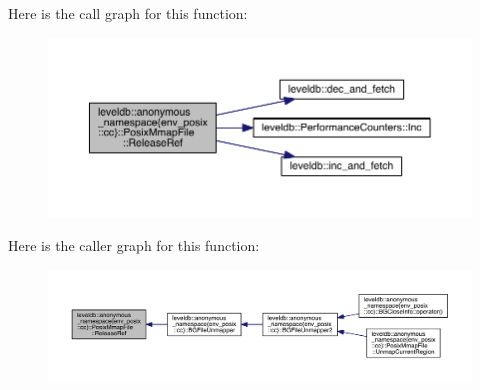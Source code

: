 Here is the call graph for this function\+:
\nopagebreak
\begin{figure}[H]
\begin{center}
\leavevmode
\includegraphics[width=350pt]{classleveldb_1_1anonymous__namespace_02env__posix_8cc_03_1_1_posix_mmap_file_a2a19f6a33c994f7be4df4a185accbeba_cgraph}
\end{center}
\end{figure}




Here is the caller graph for this function\+:
\nopagebreak
\begin{figure}[H]
\begin{center}
\leavevmode
\includegraphics[width=350pt]{classleveldb_1_1anonymous__namespace_02env__posix_8cc_03_1_1_posix_mmap_file_a2a19f6a33c994f7be4df4a185accbeba_icgraph}
\end{center}
\end{figure}


\hypertarget{classleveldb_1_1anonymous__namespace_02env__posix_8cc_03_1_1_posix_mmap_file_a33760c00bffb3dccc48f432ca3150405}{}
